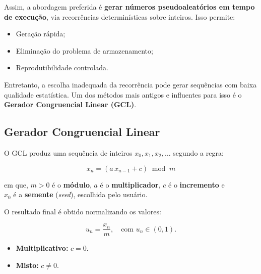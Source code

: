 \documentclass[
  letterpaper,
  DIV=11,
  numbers=noendperiod]{scrreprt}
\providecommand{\tightlist}{%
  \setlength{\itemsep}{0pt}\setlength{\parskip}{0pt}}\usepackage{longtable,booktabs,array}
\begin{document}
Assim, a abordagem preferida é \textbf{gerar números pseudoaleatórios em
tempo de execução}, via recorrências determinísticas sobre inteiros.
Isso permite:

\begin{itemize}
\tightlist
\item
  Geração rápida;
\item
  Eliminação do problema de armazenamento;
\item
  Reprodutibilidade controlada.
\end{itemize}

Entretanto, a escolha inadequada da recorrência pode gerar sequências
com baixa qualidade estatística. Um dos métodos mais antigos e
influentes para isso é o \textbf{Gerador Congruencial Linear (GCL)}.

\subsection*{Gerador Congruencial
Linear}\label{gerador-congruencial-linear}

O GCL produz uma sequência de inteiros \(x_0, x_1, x_2, \dots\) segundo
a regra:

\[x_n = (a \, x_{n-1} + c) \;\; \text{mod} \;\; m\]

em que, \(m > 0\) é o \textbf{módulo}, \(a\) é o \textbf{multiplicador},
\(c\) é o \textbf{incremento} e\\
\(x_0\) é a \textbf{semente} (\emph{seed}), escolhida pelo usuário.

O resultado final é obtido normalizando os valores:

\[u_n = \frac{x_n}{m}, \quad \text{com } u_n \in (0, 1).\]

\begin{tcolorbox}[enhanced jigsaw, left=2mm, toprule=.15mm, opacityback=0, title=\textcolor{quarto-callout-note-color}{\faInfo}\hspace{0.5em}{Tipos}, leftrule=.75mm, breakable, colbacktitle=quarto-callout-note-color!10!white, coltitle=black, rightrule=.15mm, bottomtitle=1mm, toptitle=1mm, colframe=quarto-callout-note-color-frame, colback=white, opacitybacktitle=0.6, bottomrule=.15mm, arc=.35mm, titlerule=0mm]

\begin{itemize}
\tightlist
\item
  \textbf{Multiplicativo:} \(c = 0\).\\
\item
  \textbf{Misto:} \(c \neq 0\).
\end{itemize}

\end{tcolorbox}
\end{document}
